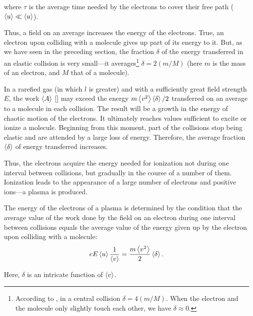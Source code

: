 \noindent
where $\tau$ is the average time needed by the electrons to cover their free path ($\left\langle u \right\rangle\ll\left\langle u \right\rangle$).

Thus, a field on an average increases the energy of the electrons.
True, an electron upon colliding with a molecule gives up part of its energy to it.
But, as we have seen in the preceding section, the fraction $\delta$ of the energy transferred in an elastic collision is very small---it averages\footnote{According to , in a central collision $\delta = 4(m/M)$. When the electron and the molecule only slightly touch each other, we have $\delta\approx 0$.} $\delta = 2(m/M)$ (here $m$ is the mass of an electron, and $M$ that of a molecule).

In a rarefied gas (in which $l$ is greater) and with a sufficiently great field strength $E$, the work $\left\langle A \right\rangle$ [] may exceed the energy $m\left\langle v^2 \right\rangle\left\langle \delta \right\rangle/2$ transferred on an average to a molecule in each collision.
The result will be a growth in the energy of chaotic motion of the electrons.
It ultimately reaches values sufficient to excite or ionize a molecule.
Beginning from this moment, part of the collisions stop being elastic and are attended by a large loss of energy.
Therefore, the average fraction $\left\langle \delta \right\rangle$ of energy transferred increases.

Thus, the electrons acquire the energy needed for ionization not during one interval between collisions, but gradually in the course of a number of them.
Ionization leads to the appearance of a large number of electrons and positive ions---a plasma is produced.

The energy of the electrons of a plasma is determined by the condition that the average value of the work done by the field on an electron during one interval between collisions equals the average value of the energy given up by the electron upon colliding with a molecule:
\begin{equation*}
    e E \left\langle u \right\rangle \frac{1}{\left\langle v \right\rangle} = \frac{m \left\langle v^2 \right\rangle}{2} \left\langle \delta \right\rangle.
\end{equation*}

\noindent
Here, $\delta$ is an intricate function of $\left\langle v \right\rangle$.

